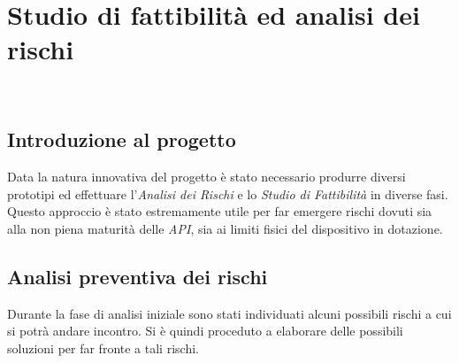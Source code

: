 
\chapter{Studio di fattibilità ed analisi dei rischi}
\label{cap:descrizione-stage}

\\

\section{Introduzione al progetto}
Data la natura innovativa del progetto è stato necessario produrre diversi prototipi ed effettuare l'\emph{Analisi dei Rischi} e lo \emph{Studio di Fattibilità} in diverse fasi.\\
Questo approccio è stato estremamente utile per far emergere rischi dovuti sia alla non piena maturità delle \emph{API}, sia ai limiti fisici del dispositivo in dotazione.


\section{Analisi preventiva dei rischi}

Durante la fase di analisi iniziale sono stati individuati alcuni possibili rischi a cui si potrà andare incontro.
Si è quindi proceduto a elaborare delle possibili soluzioni per far fronte a tali rischi.\\

